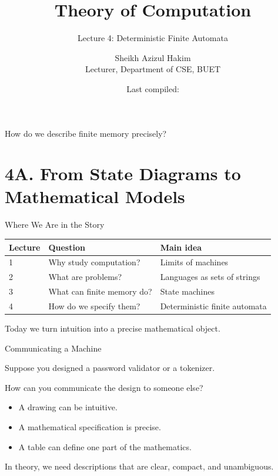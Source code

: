 \documentclass[10pt,aspectratio=169]{beamer}
\title{Theory of Computation}
\subtitle{Lecture 4: Deterministic Finite Automata}
\author{Sheikh Azizul Hakim\\Lecturer, Department of CSE, BUET}
\date{Last compiled: \LastCompiled}
\begin{document}
\maketitle

\begin{frame}[standout]
How do we describe finite memory precisely?
\end{frame}

\section{4A. From State Diagrams to Mathematical Models}

\begin{frame}{Where We Are in the Story}

\begin{center}
\begin{tabular}{lll}
\toprule
\textbf{Lecture} & \textbf{Question} & \textbf{Main idea}\\
\midrule
1 & Why study computation? & Limits of machines\\
2 & What are problems? & Languages as sets of strings\\
3 & What can finite memory do? & State machines\\
4 & How do we specify them? & Deterministic finite automata\\
\bottomrule
\end{tabular}
\end{center}

\vspace{1em}

Today we turn intuition into a precise mathematical object.

\end{frame}

\begin{frame}{Communicating a Machine}

Suppose you designed a password validator or a tokenizer.

\vspace{1em}

How can you communicate the design to someone else?

\pause

\begin{itemize}
\item A drawing can be intuitive.
\pause
\item A mathematical specification is precise.
\pause
\item A table can define one part of the mathematics.
\end{itemize}

\vspace{1em}

In theory, we need descriptions that are clear, compact, and unambiguous.

\end{frame}
\end{document}
